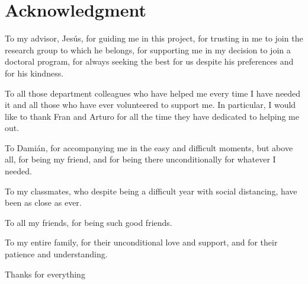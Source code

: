 \chapter*{Acknowledgment}
\pagestyle{empty}

\lettrine[lraise=-0.1, lines=2, loversize=0.25]{}{}
To my advisor, Jesús, for guiding me in this project, for trusting in me to join the research group to which he belongs, for supporting me in my decision to join a doctoral program, for always seeking the best for us despite his preferences and for his kindness. 

To all those department colleagues who have helped me every time I have needed it and all those who have ever volunteered to support me. In particular, I would like to thank Fran and Arturo for all the time they have dedicated to helping me out. 

To Damián, for accompanying me in the easy and difficult moments, but above all, for being my friend, and for being there unconditionally for whatever I needed. 

To my classmates, who despite being a difficult year with social distancing, have been as close as ever.

To all my friends, for being such good friends. 

To my entire family, for their unconditional love and support, and for their patience and understanding. 

\vspace{1.3cm}
Thanks for everything
{}%
{}%
